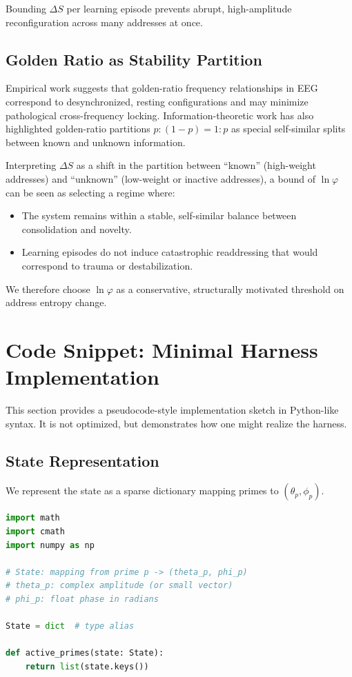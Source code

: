 \documentclass[11pt]{article}
\begin{document}
Bounding $\Delta S$ per learning episode prevents abrupt, high-amplitude reconfiguration across many addresses at once.

\subsection{Golden Ratio as Stability Partition}

Empirical work suggests that golden-ratio frequency relationships in EEG correspond to desynchronized, resting configurations and may minimize pathological cross-frequency locking. \cite{GoldenEEG} Information-theoretic work has also highlighted golden-ratio partitions $p : (1-p) = 1 : p$ as special self-similar splits between known and unknown information. \cite{GoldenRatioInfo}

Interpreting $\Delta S$ as a shift in the partition between ``known'' (high-weight addresses) and ``unknown'' (low-weight or inactive addresses), a bound of $\ln \varphi$ can be seen as selecting a regime where:

\begin{itemize}[noitemsep]
  \item The system remains within a stable, self-similar balance between consolidation and novelty.
  \item Learning episodes do not induce catastrophic readdressing that would correspond to trauma or destabilization.
\end{itemize}

We therefore choose $\ln \varphi$ as a conservative, structurally motivated threshold on address entropy change.

\section{Code Snippet: Minimal Harness Implementation}

This section provides a pseudocode-style implementation sketch in Python-like syntax. It is not optimized, but demonstrates how one might realize the harness.

\subsection{State Representation}

We represent the state as a sparse dictionary mapping primes to $(\theta_p, \phi_p)$.

\begin{lstlisting}[language=Python,caption={Prime-indexed harness state representation}]
import math
import cmath
import numpy as np

# State: mapping from prime p -> (theta_p, phi_p)
# theta_p: complex amplitude (or small vector)
# phi_p: float phase in radians

State = dict  # type alias

def active_primes(state: State):
    return list(state.keys())
\end{lstlisting}
\end{document}

